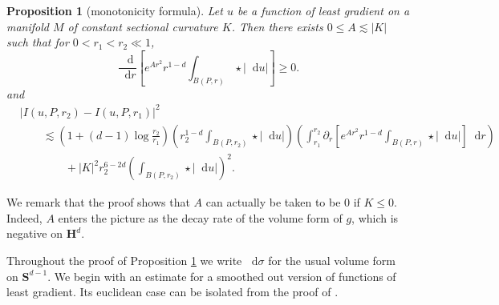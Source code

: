 \documentclass[reqno,11pt]{amsart}
\newcommand{\Hyp}{\mathbf H}
\newcommand{\Sph}{\mathbf S}
\newcommand*\dif{\mathop{}\!\mathrm{d}}
\newtheorem{proposition}[theorem]{Proposition}
\theoremstyle{definition}
\numberwithin{equation}{section}
\begin{document}
\begin{proposition}[monotonicity formula]\label{Monotone}
Let $u$ be a function of least gradient on a manifold $M$ of constant sectional curvature $K$.
Then there exists $0 \leq A \lesssim |K|$ such that for $0 < r_1 < r_2 \ll 1$,
\begin{equation}\label{weak monotonicity}
\frac{\dif}{\dif r}\left[e^{Ar^2}r^{1 - d} \int_{B(P, r)} \star |\dif u|\right] \geq 0.
\end{equation}
and
\begin{align*}
&|I(u, P, r_2) - I(u, P, r_1)|^2 \\
&\qquad \lesssim \left(1 + (d - 1) \log \frac{r_2}{r_1}\right) \left(r_2^{1 - d}\int_{B(P, r_2)} \star |\dif u| \right)
\left(\int_{r_1}^{r_2} \partial_r \left[e^{Ar^2} r^{1 - d} \int_{B(P, r)} \star |\dif u|\right] \dif r\right)\\
&\qquad \qquad + |K|^2 r_2^{6-2d} \left(\int_{B(P, r_2)} \star |\dif u|\right)^2.
\end{align*}
\end{proposition}

We remark that the proof shows that $A$ can actually be taken to be $0$ if $K \leq 0$.
Indeed, $A$ enters the picture as the decay rate of the volume form of $g$, which is negative on $\Hyp^d$.

Throughout the proof of Proposition \ref{Monotone} we write $\dif \sigma$ for the usual volume form on $\Sph^{d - 1}$.
We begin with an estimate for a smoothed out version of functions of least gradient.
Its euclidean case can be isolated from the proof of \cite[Lemma 5.8]{Giusti77}.
\end{document}

